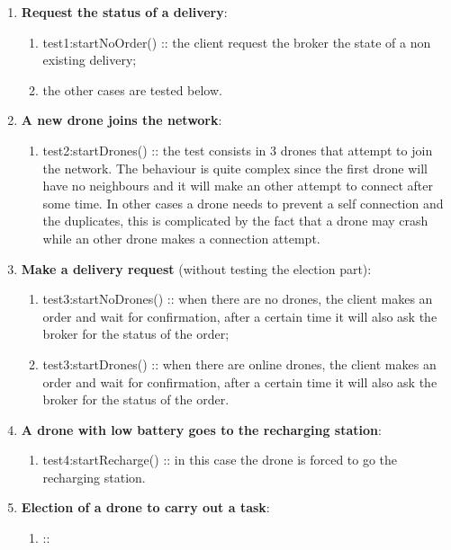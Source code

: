 \documentclass[a4paper, oneside]{memoir}
\begin{document}
\begin{enumerate}
\item \textbf{Request the status of a delivery}:
	\begin{enumerate}
	\item \textsf{test1:startNoOrder()} :: the client request the broker the state of a non existing delivery;
	\item the other cases are tested below.
	\end{enumerate}

\item \textbf{A new drone joins the network}:
	\begin{enumerate}
	\item \textsf{test2:startDrones()} :: the test consists in 3 drones that attempt to join the network. The behaviour is quite complex since the first drone will have no neighbours and it will make an other attempt to connect after some time. In other cases a drone needs to prevent a self connection and the duplicates, this is complicated by the fact that a drone may crash while an other drone makes a connection attempt.
	\end{enumerate}

\item \textbf{Make a delivery request} (without testing the election part):
	\begin{enumerate}
	\item \textsf{test3:startNoDrones()} :: when there are no drones, the client makes an order and wait for confirmation, after a certain time it will also ask the broker for the status of the order;
	\item \textsf{test3:startDrones()} :: when there are online drones, the client makes an order and wait for confirmation, after a certain time it will also ask the broker for the status of the order.
	\end{enumerate}

\item \textbf{A drone with low battery goes to the recharging station}:
	\begin{enumerate}
	\item \textsf{test4:startRecharge()} :: in this case the drone is forced to go the recharging station.
	\end{enumerate}

\item \textbf{Election of a drone to carry out a task}:
	\begin{enumerate}
	\item \textsf{} ::
	\end{enumerate}


\end{enumerate}
\end{document}

